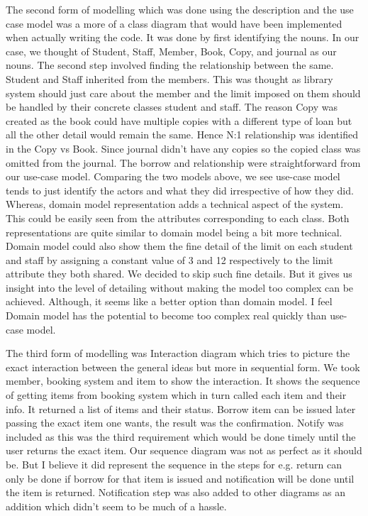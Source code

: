 The second form of modelling which was done using the description and the use case model was a more of a class diagram that would have been implemented when actually writing the code. It was done by first identifying the nouns. In our case, we thought of Student, Staff, Member, Book, Copy, and journal as our nouns. The second step involved finding the relationship between the same. Student and Staff inherited from the members. This was thought as library system should just care about the member and the limit imposed on them should be handled by their concrete classes student and staff. The reason Copy was created as the book could have multiple copies with a different type of loan but all the other detail would remain the same. Hence N:1 relationship was identified in the Copy vs Book. Since journal didn't have any copies so the copied class was omitted from the journal. The borrow and relationship were straightforward from our use-case model. Comparing the two models above, we see use-case model tends to just identify the actors and what they did irrespective of how they did. Whereas, domain model representation adds a technical aspect of the system. This could be easily seen from the attributes corresponding to each class. Both representations are quite similar to domain model being a bit more technical. Domain model could also show them the fine detail of the limit on each student and staff by assigning a constant value of 3 and 12 respectively to the limit attribute they both shared. We decided to skip such fine details. But it gives us insight into the level of detailing without making the model too complex can be achieved. Although, it seems like a better option than domain model. I feel Domain model has the potential to become too complex real quickly than use-case model. 

The third form of modelling was Interaction diagram which tries to picture the exact interaction between the general ideas but more in sequential form. We took member, booking system and item to show the interaction. It shows the sequence of getting items from booking system which in turn called each item and their info. It returned a list of items and their status. Borrow item can be issued later passing the exact item one wants, the result was the confirmation. Notify was included as this was the third requirement which would be done timely until the user returns the exact item. Our sequence diagram was not as perfect as it should be. But I believe it did represent the sequence in the steps for e.g. return can only be done if borrow for that item is issued and notification will be done until the item is returned. Notification step was also added to other diagrams as an addition which didn't seem to be much of a hassle. 

